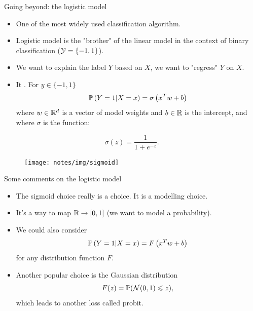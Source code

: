 \documentclass[xcolor={usenames,dvipsnames},handout]{beamer}
\begin{document}
\begin{frame}{Going beyond: the logistic model}

\begin{itemize}
\item One of the most widely used classification algorithm.

\item Logistic model is the "brother" of the linear model in the context of binary classification 
($\Yc = \{-1, 1\}$).

\item We want to explain the label $Y$ based on $X$, we want to
"regress" $Y$ on $X$.

\item It .
For $y\in \{-1, 1\}$
$$
\P\left(  Y = 1 | X =x \right) = \sigma \left( x^T w +b \right)
$$
where $w\in \R^d$ is a vector of model weights and $b\in\R$ is the
intercept, and where $\sigma$ is the  function:
\end{itemize}
\begin{minipage}{0.45\textwidth}
$$
\sigma(z) = \frac{1}{1+e^{-z}}. 
$$
\end{minipage}
\begin{minipage}{0.35\textwidth}
\begin{figure}[H]
\begin{center}
\texttt{[image: notes/img/sigmoid]}
\end{center}
\end{figure}
\end{minipage}
\end{frame}



\begin{frame}{Some comments on the logistic model}
\begin{itemize}
\item The sigmoid choice really is a choice. It is a modelling choice.
\item It's a way to map $\R \to [0, 1]$ (we want to model a probability).
\item We could also consider
$$
\P\left(  Y = 1 | X =x \right) = F \left( x^T w +b \right)
$$
for any distribution function $F$. 
\pause
\item Another popular choice is the
Gaussian distribution
$$ F(z) = \P(\Nc(0,1) \leq  z),
$$
which leads to another loss called {\color{PineGreen}probit}.
\end{itemize}
\end{frame}
\end{document}

